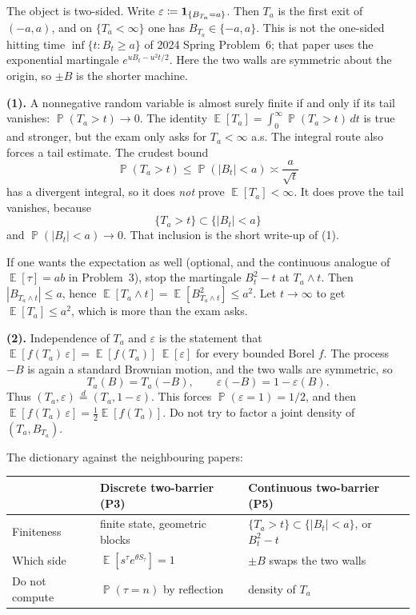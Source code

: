 \documentclass[11pt,a4paper]{article}
\DeclareMathOperator{\E}{\mathbb{E}}
\DeclareMathOperator{\Pbb}{\mathbb{P}}
\begin{document}
The object is two-sided. Write \( \varepsilon\coloneqq\mathbf{1}_{\{B_{T_a}=a\}} \). Then \( T_a \) is the first exit of \( (-a,a) \), and on \( \{T_a<\infty\} \) one has \( B_{T_a}\in\{-a,a\} \). This is not the one-sided hitting time \( \inf\{t:B_t\ge a\} \) of 2024 Spring Problem~6; that paper uses the exponential martingale \( e^{uB_t-u^{2}t/2} \). Here the two walls are symmetric about the origin, so \( \pm B \) is the shorter machine.

\textbf{(1).}
A nonnegative random variable is almost surely finite if and only if its tail vanishes: \( \Pbb(T_a>t)\to 0 \). The identity \( \E[T_a]=\int_0^{\infty}\Pbb(T_a>t)\,dt \) is true and stronger, but the exam only asks for \( T_a<\infty \) a.s. The integral route also forces a tail estimate. The crudest bound
\[
\Pbb(T_a>t)
\le
\Pbb(|B_t|<a)
\asymp
\frac{a}{\sqrt{t}}
\]
has a divergent integral, so it does \emph{not} prove \( \E[T_a]<\infty \). It does prove the tail vanishes, because
\[
\{T_a>t\}
\subset
\{|B_t|<a\}
\]
and \( \Pbb(|B_t|<a)\to 0 \). That inclusion is the short write-up of (1).

If one wants the expectation as well (optional, and the continuous analogue of \( \E[\tau]=ab \) in Problem~3), stop the martingale \( B_t^{2}-t \) at \( T_a\wedge t \). Then \( |B_{T_a\wedge t}|\le a \), hence \( \E[T_a\wedge t]=\E[B_{T_a\wedge t}^{2}]\le a^{2} \). Let \( t\to\infty \) to get \( \E[T_a]\le a^{2} \), which is more than the exam asks.

\textbf{(2).}
Independence of \( T_a \) and \( \varepsilon \) is the statement that \( \E[f(T_a)\,\varepsilon]=\E[f(T_a)]\,\E[\varepsilon] \) for every bounded Borel \( f \). The process \( -B \) is again a standard Brownian motion, and the two walls are symmetric, so
\[
T_a(B)=T_a(-B),
\qquad
\varepsilon(-B)=1-\varepsilon(B).
\]
Thus \( (T_a,\varepsilon)\stackrel{d}{=}(T_a,1-\varepsilon) \). This forces \( \Pbb(\varepsilon=1)=1/2 \), and then \( \E[f(T_a)\,\varepsilon]=\frac12\E[f(T_a)] \). Do not try to factor a joint density of \( (T_a,B_{T_a}) \).

The dictionary against the neighbouring papers:

\begin{center}
\renewcommand{\arraystretch}{1.25}
\small
\begin{tabular}{@{}lll@{}}
\toprule
& Discrete two-barrier (P3) & Continuous two-barrier (P5) \\
\midrule
Finiteness & finite state, geometric blocks & \( \{T_a>t\}\subset\{|B_t|<a\} \), or \( B_t^{2}-t \) \\
Which side & \( \E[s^{\tau}e^{\theta S_{\tau}}]=1 \) & \( \pm B \) swaps the two walls \\
Do not compute & \( \Pbb(\tau=n) \) by reflection & density of \( T_a \) \\
\bottomrule
\end{tabular}
\end{center}
\end{document}
